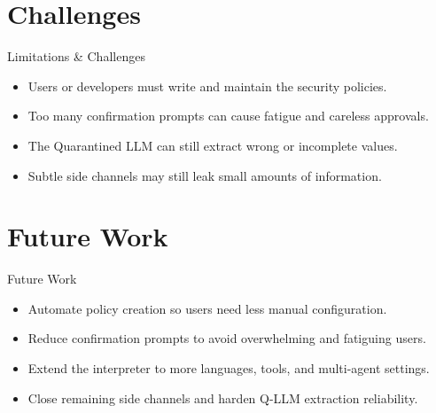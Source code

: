 \documentclass[10pt]{beamer}
\begin{document}
\section{Challenges}
\begin{frame}{Limitations \& Challenges}
\begin{itemize}
  \item Users or developers must write and maintain the security policies.
  \item Too many confirmation prompts can cause fatigue and careless approvals.
  \item The Quarantined LLM can still extract wrong or incomplete values.
  \item Subtle side channels may still leak small amounts of information.
\end{itemize}
\end{frame}
\section{Future Work}
\begin{frame}{Future Work}
\begin{itemize}
  \item Automate policy creation so users need less manual configuration.
  \item Reduce confirmation prompts to avoid overwhelming and fatiguing users.
  \item Extend the interpreter to more languages, tools, and multi-agent settings.
  \item Close remaining side channels and harden Q-LLM extraction reliability.
\end{itemize}
\end{frame}
\end{document}
